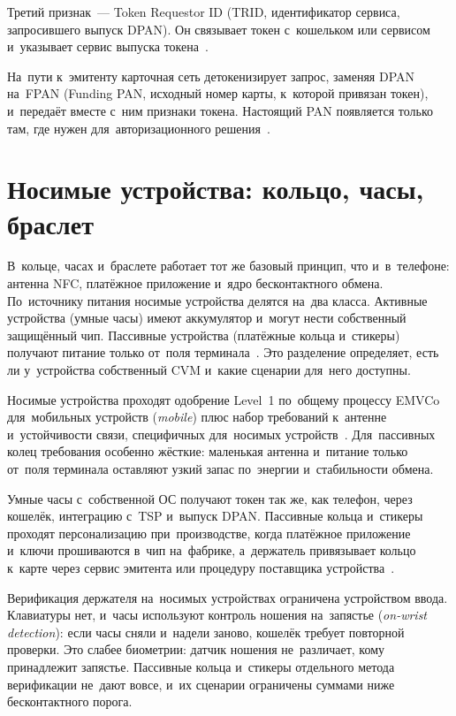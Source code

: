 Третий признак~--- Token Requestor ID (TRID, идентификатор сервиса,
запросившего выпуск DPAN). Он связывает токен с~кошельком или
сервисом и~указывает сервис выпуска токена~\cite{emvco-payment-tokenisation}.

На~пути к~эмитенту карточная сеть детокенизирует запрос, заменяя DPAN на~FPAN
(Funding PAN, исходный номер карты, к~которой привязан токен), и~передаёт вместе с~ним
признаки токена. Настоящий PAN появляется только там, где нужен
для~авторизационного решения~\cite{emvco-payment-tokenisation}.

\section{Носимые устройства: кольцо, часы, браслет}\label{sec:contactless-wearables}

В~кольце, часах и~браслете работает тот же базовый принцип, что и~в~телефоне:
антенна NFC, платёжное приложение и~ядро бесконтактного обмена. По~источнику
питания носимые устройства делятся на~два класса. Активные устройства (умные
часы) имеют аккумулятор и~могут нести собственный защищённый чип. Пассивные
устройства (платёжные кольца и~стикеры) получают питание только от~поля
терминала~\cite{emvco-contactless-chip,emvco-contactless-book-a}. Это
разделение определяет, есть ли у~устройства собственный CVM и~какие сценарии
для~него доступны.

Носимые устройства проходят одобрение Level~1 по~общему
процессу EMVCo для~мобильных устройств (\textit{mobile}) плюс набор требований
к~антенне и~устойчивости связи, специфичных для~носимых
устройств~\cite{emvco-mobile,emvco-wearable-level-1-approval-process}.
Для~пассивных колец требования особенно жёсткие: маленькая антенна и~питание
только от~поля терминала оставляют узкий запас по~энергии и~стабильности
обмена.

Умные часы с~собственной ОС получают токен так же, как телефон, через кошелёк,
интеграцию с~TSP и~выпуск DPAN. Пассивные кольца и~стикеры проходят
персонализацию при~производстве, когда платёжное приложение и~ключи
прошиваются в~чип на~фабрике, а~держатель привязывает кольцо к~карте через
сервис эмитента или процедуру поставщика устройства~\cite{emvco-mobile}.

Верификация держателя на~носимых устройствах ограничена устройством ввода.
Клавиатуры нет, и~часы используют контроль ношения на~запястье
(\textit{on-wrist detection}): если часы сняли и~надели заново, кошелёк требует
повторной проверки. Это слабее биометрии: датчик ношения не~различает, кому
принадлежит запястье. Пассивные кольца и~стикеры отдельного метода верификации
не~дают вовсе, и~их сценарии ограничены суммами ниже бесконтактного порога.

